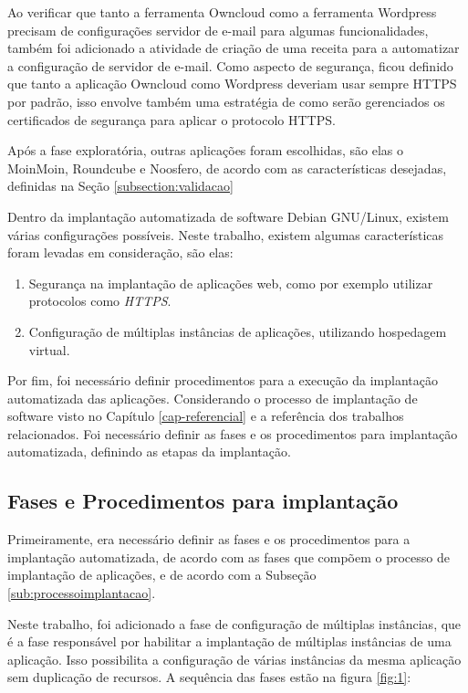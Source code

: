 Ao verificar que tanto a ferramenta Owncloud como a ferramenta Wordpress precisam
de configurações servidor de e-mail para algumas funcionalidades, também foi adicionado
a atividade de criação de uma receita para a automatizar a configuração de
servidor de e-mail. Como aspecto de segurança, ficou definido que tanto a aplicação
Owncloud como Wordpress deveriam usar sempre HTTPS por padrão, isso envolve também
uma estratégia de como serão gerenciados os certificados de segurança para aplicar
o protocolo HTTPS. 

Após a fase exploratória, outras aplicações foram escolhidas, são elas o MoinMoin, 
Roundcube e Noosfero, de acordo com as características desejadas, 
definidas na Seção \ref{subsection:validacao}

Dentro da implantação automatizada de software Debian GNU/Linux, existem várias
configurações possíveis. Neste trabalho, existem algumas características foram 
levadas em consideração, são elas:

\begin{enumerate}
  \item  Segurança na implantação de aplicações web,
   como por exemplo utilizar protocolos como \textit{HTTPS}.
  \item  Configuração de múltiplas instâncias de
   aplicações, utilizando hospedagem virtual.
\end{enumerate}

Por fim, foi necessário definir procedimentos para a execução da implantação 
automatizada das aplicações. Considerando
o processo de implantação de software visto no Capítulo \ref{cap-referencial}
e a referência dos trabalhos relacionados. Foi necessário definir as fases e os
procedimentos para implantação automatizada, definindo as etapas
da implantação.

\subsection{Fases e Procedimentos para implantação}
\label{sec:fases}

Primeiramente, era necessário definir as fases e os procedimentos para a implantação 
automatizada, de acordo com as fases que compõem o processo de 
implantação de aplicações, e de acordo com a Subseção \ref{sub:processoimplantacao}. 

Neste trabalho, foi adicionado a fase de configuração de múltiplas
instâncias, que é a fase responsável por habilitar a implantação de múltiplas 
instâncias de uma aplicação. Isso possibilita a configuração 
de várias instâncias da mesma aplicação sem duplicação de recursos. A sequência
das fases estão na figura \ref{fig:1}:

